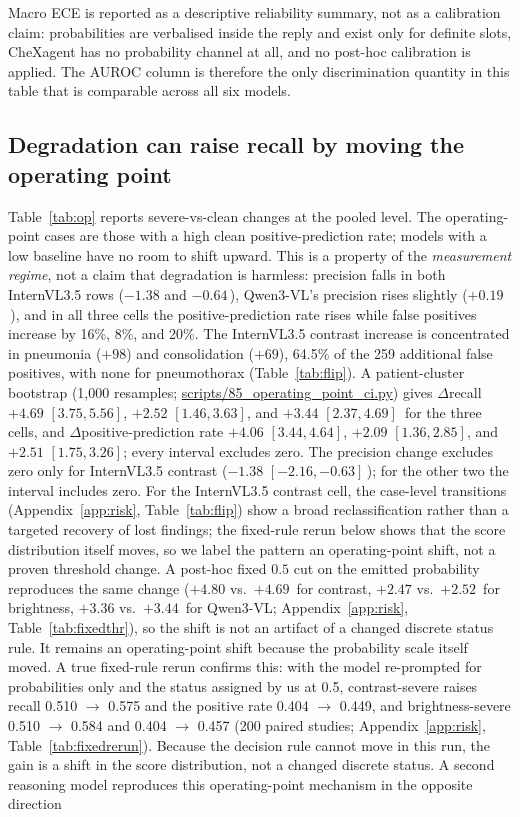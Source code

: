 Macro ECE is reported as a descriptive reliability summary, not as a calibration claim: probabilities are verbalised inside the reply and exist only for definite slots, CheXagent has no probability channel at all, and no post-hoc calibration is applied. The AUROC column is therefore the only discrimination quantity in this table that is comparable across all six models.

\subsection{Degradation can raise recall by moving the operating point}
\label{sec:results-op}

Table~\ref{tab:op} reports severe-vs-clean changes at the pooled level. The operating-point cases are those with a high clean positive-prediction rate; models with a low baseline have no room to shift upward. This is a property of the \emph{measurement regime}, not a claim that degradation is harmless: precision falls in both InternVL3.5 rows ($-1.38$ and $-0.64$\,\pp{}), Qwen3-VL's precision rises slightly ($+0.19$\,\pp{}), and in all three cells the positive-prediction rate rises while false positives increase by 16\%, 8\%, and 20\%. The InternVL3.5 contrast increase is concentrated in pneumonia ($+98$) and consolidation ($+69$), 64.5\% of the 259 additional false positives, with none for pneumothorax (Table~\ref{tab:flip}). A patient-cluster bootstrap (1,000 resamples; \url{scripts/85_operating_point_ci.py}) gives $\Delta$recall $+4.69$ $[3.75,5.56]$, $+2.52$ $[1.46,3.63]$, and $+3.44$ $[2.37,4.69]$\,\pp{} for the three cells, and $\Delta$positive-prediction rate $+4.06$ $[3.44,4.64]$, $+2.09$ $[1.36,2.85]$, and $+2.51$ $[1.75,3.26]$; every interval excludes zero. The precision change excludes zero only for InternVL3.5 contrast ($-1.38$ $[-2.16,-0.63]$\,\pp{}); for the other two the interval includes zero. For the InternVL3.5 contrast cell, the case-level transitions (Appendix~\ref{app:risk}, Table~\ref{tab:flip}) show a broad reclassification rather than a targeted recovery of lost findings; the fixed-rule rerun below shows that the score distribution itself moves, so we label the pattern an operating-point shift, not a proven threshold change. A post-hoc fixed $0.5$ cut on the emitted probability reproduces the same change ($+4.80$ vs.\ $+4.69$\,\pp{} for contrast, $+2.47$ vs.\ $+2.52$\,\pp{} for brightness, $+3.36$ vs.\ $+3.44$\,\pp{} for Qwen3-VL; Appendix~\ref{app:risk}, Table~\ref{tab:fixedthr}), so the shift is not an artifact of a changed discrete status rule. It remains an operating-point shift because the probability scale itself moved. A true fixed-rule rerun confirms this: with the model re-prompted for probabilities only and the status assigned by us at 0.5, contrast-severe raises recall 0.510 $\rightarrow$ 0.575 and the positive rate 0.404 $\rightarrow$ 0.449, and brightness-severe 0.510 $\rightarrow$ 0.584 and 0.404 $\rightarrow$ 0.457 (200 paired studies; Appendix~\ref{app:risk}, Table~\ref{tab:fixedrerun}). Because the decision rule cannot move in this run, the gain is a shift in the score distribution, not a changed discrete status. A second reasoning model reproduces this operating-point mechanism in the opposite direction 